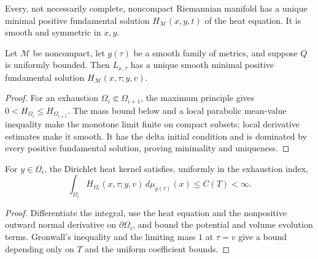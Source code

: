 \begin{theorem}
\label{thm:chow-iii-noncompact-static-heat-kernel}

Every, not necessarily complete, noncompact Riemannian manifold has a unique
minimal positive fundamental solution \(H_{\mathcal M}(x,y,t)\) of the heat
equation.  It is smooth and symmetric in \(x,y\).
\end{theorem}

\begin{theorem}
\label{thm:chow-iii-noncompact-evolving-heat-kernel}


Let \(\mathcal M\) be noncompact, let \(g(\tau)\) be a smooth family of
metrics, and suppose \(Q\) is uniformly bounded.  Then \(L_{x,\tau}\) has a
unique smooth minimal positive fundamental solution
\(H_{\mathcal M}(x,\tau;y,v)\).
\end{theorem}
\begin{proof}
\sketch For an exhaustion \(\Omega_i\Subset\Omega_{i+1}\), the maximum principle gives
\(0<H_{\Omega_i}\le H_{\Omega_{i+1}}\).  The mass bound below and a local
parabolic mean-value inequality make the monotone limit finite on compact
subsets; local derivative estimates make it smooth.  It has the delta initial
condition and is dominated by every positive fundamental solution, proving
minimality and uniqueness.
\end{proof}

\begin{lemma}
\label{lem:chow-iii-dirichlet-kernel-mass-bound}


For \(y\in\Omega_i\), the Dirichlet heat kernel satisfies, uniformly in the
exhaustion index,
\[
 \int_{\Omega_i}H_{\Omega_i}(x,\tau;y,v)
 \,d\mu_{g(\tau)}(x)\le C(T)<\infty.
\]
\end{lemma}
\begin{proof}
\sketch Differentiate the integral, use the heat equation and the nonpositive outward
normal derivative on \(\partial\Omega_i\), and bound the potential and volume
evolution terms.  Gronwall's inequality and the limiting mass \(1\) at
\(\tau=v\) give a bound depending only on \(T\) and the uniform coefficient
bounds.
\end{proof}

